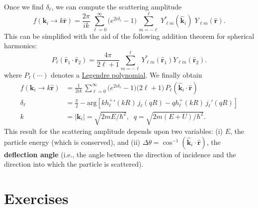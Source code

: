 \documentclass[pra,12pt]{revtex4}
\begin{document}
Once we find $\delta_\ell$, we can compute the scattering amplitude
\begin{equation}
  f(\mathbf{k}_i\rightarrow k\hat{\mathbf{r}}) = \frac{2 \pi}{ik}\, \sum_{\ell =0}^\infty \big(e^{2i\delta_\ell} - 1\big) \, \sum_{m=-\ell}^\ell \,Y_{\ell m}^*(\hat{\mathbf{k}}_i)\; Y_{\ell m}(\hat{\mathbf{r}}).
\end{equation}
This can be simplified with the aid of the following addition theorem
for spherical harmonics:
\begin{equation}
  P_\ell(\hat{\mathbf{r}}_1\cdot\hat{\mathbf{r}}_2) = \frac{4\pi}{2\ell+1} \sum_{m=-\ell}^{\ell} Y_{\ell m}^*(\hat{\mathbf{r}}_1) Y_{\ell m}(\hat{\mathbf{r}}_2).
\end{equation}
where $P_\ell(\cdots)$ denotes a
\href{https://en.wikipedia.org/wiki/Legendre_polynomials}{Legendre
  polynomial}.  We finally obtain
\begin{equation}
  \boxed{\quad\begin{aligned}f(\mathbf{k}_i \rightarrow k\hat{\mathbf{r}}) &= \frac{1}{2ik}\, \sum_{\ell =0}^\infty \big(e^{2i\delta_\ell} - 1\big) \big(2\ell+1\big)\, P_{\ell}(\hat{\mathbf{k}}_i\cdot \hat{\mathbf{r}}) \\ \delta_\ell &= \frac{\pi}{2} - \mathrm{arg}\!\left[k{h_\ell^+}'(kR) \, j_\ell(qR) - qh_\ell^+(kR)\, j_\ell'(qR)\right] \\ k &= |\mathbf{k}_i| = \sqrt{2mE/\hbar^2}, \;\; q = \sqrt{2m(E+U)/\hbar^2}.\end{aligned}\quad}
\end{equation}
This result for the scattering amplitude depends upon two variables:
(i) $E$, the particle energy (which is conserved), and (ii) $\Delta
\theta = \cos^{-1}(\hat{\mathbf{k}}_i\cdot \hat{\mathbf{r}})$, the
\textbf{deflection angle} (i.e., the angle between the direction of
incidence and the direction into which the particle is scattered).

\section*{Exercises}
\end{document}

